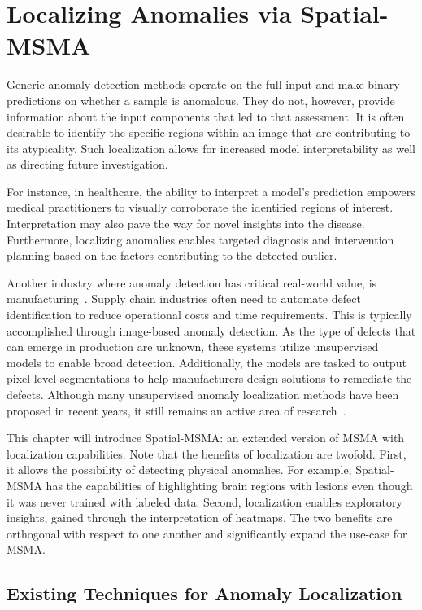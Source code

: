 \chapter{Localizing Anomalies via Spatial-MSMA}
\label{ch:localizing}

Generic anomaly detection methods operate on the full input and make binary predictions on whether a sample is anomalous. They do not, however, provide information about the input components that led to that assessment. It is often desirable to identify the specific regions within an image that are contributing to its atypicality. Such localization allows for increased model interpretability as well as directing future investigation. 

For instance, in healthcare, the ability to interpret a model's prediction empowers medical practitioners to visually corroborate the identified regions of interest. Interpretation may also pave the way for novel insights into the disease. Furthermore, localizing anomalies enables targeted diagnosis and intervention planning based on the factors contributing to the detected outlier.

Another industry where anomaly detection has critical real-world value, is manufacturing~\cite{Bergmann_2019_CVPR}. Supply chain industries often need to automate defect identification to reduce operational costs and time requirements. This is typically accomplished through image-based anomaly detection. As the type of defects that can emerge in production are unknown, these systems utilize unsupervised models to enable broad detection. Additionally,  the models are tasked to output pixel-level segmentations to help manufacturers design solutions to remediate the defects. Although many unsupervised anomaly localization methods have been proposed in recent years, it still remains an active area of research~\cite{liu2024deep}. 

This chapter will introduce Spatial-MSMA: an extended version of MSMA with localization capabilities. Note that the benefits of localization are twofold. First, it allows the possibility of detecting physical anomalies. For example, Spatial-MSMA has the capabilities of highlighting brain regions with lesions even though it was never trained with labeled data. Second, localization enables exploratory insights, gained through the interpretation of heatmaps. The two benefits are orthogonal with respect to one another and significantly expand the use-case for MSMA.

\section{Existing Techniques for Anomaly Localization}

